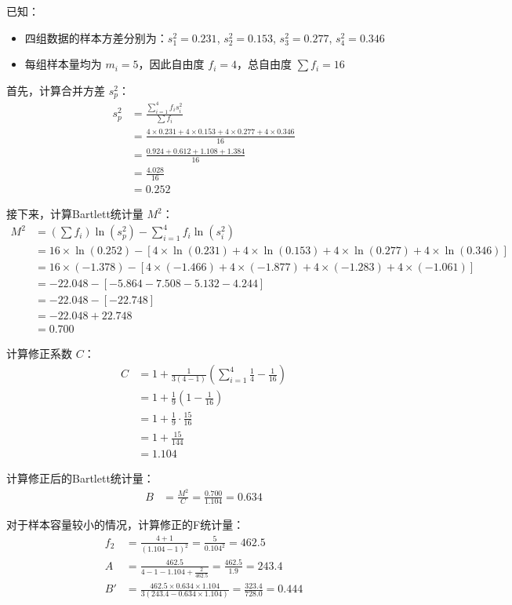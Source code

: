 \documentclass[12pt, a4paper]{amsart}
\begin{document}
已知：
\begin{itemize}
    \item 四组数据的样本方差分别为：$s_1^2 = 0.231$, $s_2^2 = 0.153$, $s_3^2 = 0.277$, $s_4^2 = 0.346$
    \item 每组样本量均为 $m_i = 5$，因此自由度 $f_i = 4$，总自由度 $\sum f_i = 16$
\end{itemize}

首先，计算合并方差 $s_p^2$：
\begin{align*}
s_p^2 &= \frac{\sum_{i=1}^{4} f_i s_i^2}{\sum f_i} \\
&= \frac{4 \times 0.231 + 4 \times 0.153 + 4 \times 0.277 + 4 \times 0.346}{16} \\
&= \frac{0.924 + 0.612 + 1.108 + 1.384}{16} \\
&= \frac{4.028}{16} \\
&= 0.252
\end{align*}

接下来，计算Bartlett统计量 $M^2$：
\begin{align*}
M^2 &= (\sum f_i) \ln(s_p^2) - \sum_{i=1}^{4} f_i \ln(s_i^2) \\
&= 16 \times \ln(0.252) - [4 \times \ln(0.231) + 4 \times \ln(0.153) + 4 \times \ln(0.277) + 4 \times \ln(0.346)] \\
&= 16 \times (-1.378) - [4 \times (-1.466) + 4 \times (-1.877) + 4 \times (-1.283) + 4 \times (-1.061)] \\
&= -22.048 - [-5.864 - 7.508 - 5.132 - 4.244] \\
&= -22.048 - [-22.748] \\
&= -22.048 + 22.748 \\
&= 0.700
\end{align*}

计算修正系数 $C$：
\begin{align*}
C &= 1 + \frac{1}{3(4-1)} \left( \sum_{i=1}^{4} \frac{1}{4} - \frac{1}{16} \right) \\
&= 1 + \frac{1}{9} \left( 1 - \frac{1}{16} \right) \\
&= 1 + \frac{1}{9} \cdot \frac{15}{16} \\
&= 1 + \frac{15}{144} \\
&= 1.104
\end{align*}

计算修正后的Bartlett统计量：
\begin{align*}
B &= \frac{M^2}{C} = \frac{0.700}{1.104} = 0.634
\end{align*}

对于样本容量较小的情况，计算修正的F统计量：
\begin{align*}
f_2 &= \frac{4+1}{(1.104-1)^2} = \frac{5}{0.104^2} = 462.5 \\
A &= \frac{462.5}{4-1-1.104+\frac{2}{462.5}} = \frac{462.5}{1.9} = 243.4 \\
B' &= \frac{462.5 \times 0.634 \times 1.104}{3(243.4 - 0.634 \times 1.104)} = \frac{323.4}{728.0} = 0.444
\end{align*}
\end{document}
